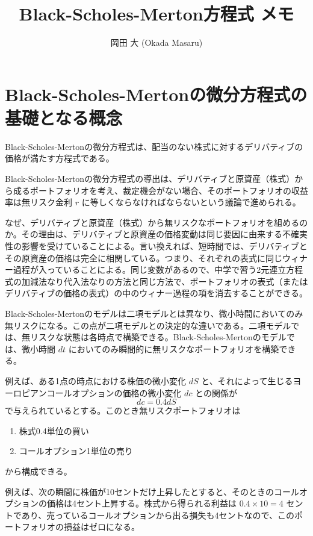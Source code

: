 \documentclass[uplatex]{jsarticle}
\title{Black-Scholes-Merton方程式 メモ}
\author{
岡田 大 (Okada Masaru)
}
\begin{document}
\maketitle

\maketitle

\section{Black-Scholes-Mertonの微分方程式の基礎となる概念}

Black-Scholes-Mertonの微分方程式は、配当のない株式に対するデリバティブの価格が満たす方程式である。

Black-Scholes-Mertonの微分方程式の導出は、デリバティブと原資産（株式）から成るポートフォリオを考え、裁定機会がない場合、そのポートフォリオの収益率は無リスク金利 $r$ に等しくならなければならないという議論で進められる。

なぜ、デリバティブと原資産（株式）から無リスクなポートフォリオを組めるのか。その理由は、デリバティブと原資産の価格変動は同じ要因に由来する不確実性の影響を受けていることによる。言い換えれば、短時間では、デリバティブとその原資産の価格は完全に相関している。つまり、それぞれの表式に同じウィナー過程が入っていることによる。同じ変数があるので、中学で習う2元連立方程式の加減法なり代入法なりの方法と同じ方法で、ポートフォリオの表式（またはデリバティブの価格の表式）の中のウィナー過程の項を消去することができる。

Black-Scholes-Mertonのモデルは二項モデルとは異なり、微小時間においてのみ無リスクになる。この点が二項モデルとの決定的な違いである。二項モデルでは、無リスクな状態は各時点で構築できる。Black-Scholes-Mertonのモデルでは、微小時間 $dt$ においてのみ瞬間的に無リスクなポートフォリオを構築できる。

\bigskip

例えば、ある1点の時点における株価の微小変化 $dS$ と、それによって生じるヨーロピアンコールオプションの価格の微小変化 $dc$ との関係が
$$
	dc = 0.4 dS
$$
で与えられているとする。このとき無リスクポートフォリオは
\begin{enumerate}
	\item 株式0.4単位の買い
	\item コールオプション1単位の売り
\end{enumerate}
から構成できる。

例えば、次の瞬間に株価が10セントだけ上昇したとすると、そのときのコールオプションの価格は4セント上昇する。株式から得られる利益は $0.4 \times 10 = 4$ セントであり、売っているコールオプションから出る損失も4セントなので、このポートフォリオの損益はゼロになる。
\end{document}
